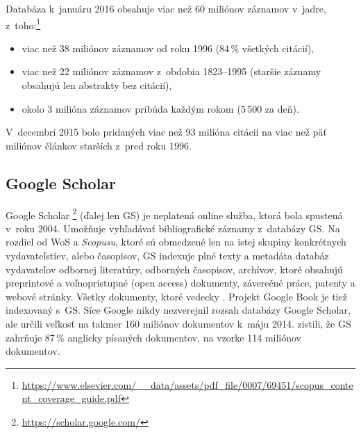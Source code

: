 Databáza k~januáru 2016 obsahuje viac než 60 miliónov záznamov v~jadre, z~toho:\footnote{\url{https://www.elsevier.com/__data/assets/pdf_file/0007/69451/scopus_content_coverage_guide.pdf}}

\begin{itemize}
  \item viac než 38 miliónov záznamov od roku 1996 (84\,\% všetkých citácií),
  \item viac než 22 miliónov záznamov z~obdobia 1823--1995 (staršie záznamy
    obsahujú len abstrakty bez citácií),
  \item okolo 3 milióna záznamov pribúda každým rokom (5\,500 za deň).
\end{itemize}

V~decembri 2015 bolo pridaných viac než 93 milióna citácií na viac než päť
miliónov článkov starších z~pred roku
1996.

\subsection{Google Scholar}
\label{sec:gs}

Google Scholar \footnote{\url{https://scholar.google.com/}} (ďalej len GS) je neplatená online
služba, ktorá bola spustená v~roku 2004.  Umožňuje vyhľadávať bibliografické
záznamy z~databázy GS. Na rozdiel od WoS a \emph{Scopusu}, ktoré sú obmedzené
len na istej skupiny konkrétnych vydavateľstiev, alebo časopisov, GS indexuje
plné texty a metadáta databáz vydavateľov odbornej literatúry, odborných
časopisov, archívov, ktoré obsahujú preprintové a voľnoprístupné (open access)
dokumenty, záverečné práce, patenty a webové stránky. Všetky dokumenty, ktoré
 vedecky \citep{Vine2006}.  Projekt Google Book je tiež indexovaný
s~GS.  Síce Google nikdy nezverejnil rozsah databázy Google Scholar, ale
\citet{Orduna-Malea2015} určili veľkosť na takmer 160 miliónov dokumentov k~máju
2014. \citet{Khabsa2014} zistili, že GS zahrňuje 87\,\% anglicky písaných
dokumentov, na vzorke 114 miliónov dokumentov.

